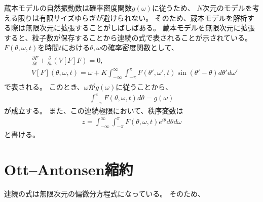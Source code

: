 \documentclass{jsarticle}
\begin{document}
蔵本モデルの自然振動数は確率密度関数$g(\omega)$に従うため、
$N$次元のモデルを考える限りは有限サイズゆらぎが避けられない。
そのため、蔵本モデルを解析する際は無限次元に拡張することがしばしばある。
蔵本モデルを無限次元に拡張すると、粒子数が保存することから連続の式で表されることが示されている。
$F(\theta,\omega,t)$を時間$t$における$\theta,\omega$の確率密度関数として、
\begin{align}
\begin{split}
&\frac{\partial F}{\partial t}+\frac{\partial}{\partial t}(V[F]F)=0,\\
&V[F](\theta,\omega,t)=\omega+K\int_{-\infty}^{\infty}\int_{-\pi}^{\pi} F(\theta',\omega',t)\sin(\theta'-\theta)d\theta'd\omega'
\end{split}
\end{align}
で表される。
このとき、$\omega$が$g(\omega)$に従うことから、
\begin{align}
\int_{-\pi}^{\pi}F(\theta,\omega,t)d\theta=g(\omega)
\end{align}
が成立する。
また、この連続極限において、秩序変数は
\begin{align}
z=\int_{-\infty}^{\infty}\int_{-\pi}^{\pi} F(\theta,\omega,t)e^{i\theta}d\theta d\omega
\end{align}
と書ける。

\section{Ott--Antonsen縮約}
連続の式は無限次元の偏微分方程式になっている。
そのため、



\end{document}
